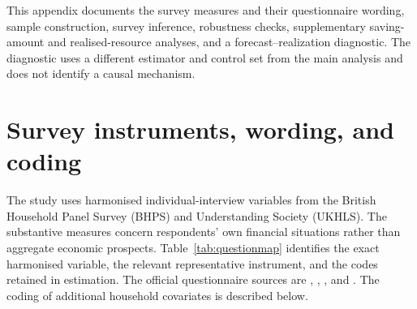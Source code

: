 
This appendix documents the survey measures and their questionnaire wording, sample construction, survey inference, robustness checks, supplementary saving-amount and realised-resource analyses, and a forecast--realization diagnostic. The diagnostic uses a different estimator and control set from the main analysis and does not identify a causal mechanism.

\section{Survey instruments, wording, and coding}\label{sec:questions}

The study uses harmonised individual-interview variables from the British Household Panel Survey (BHPS) and Understanding Society (UKHLS). The substantive measures concern respondents' own financial situations rather than aggregate economic prospects. Table~\ref{tab:questionmap} identifies the exact harmonised variable, the relevant representative instrument, and the codes retained in estimation. The official questionnaire sources are \citet{BHPSWave3Questionnaire}, \citet{UKHLSWave2Savings}, \citet{UKHLSWave4Outlook}, and \citet{UKHLSWave4Management}. The coding of additional household covariates is described below.

